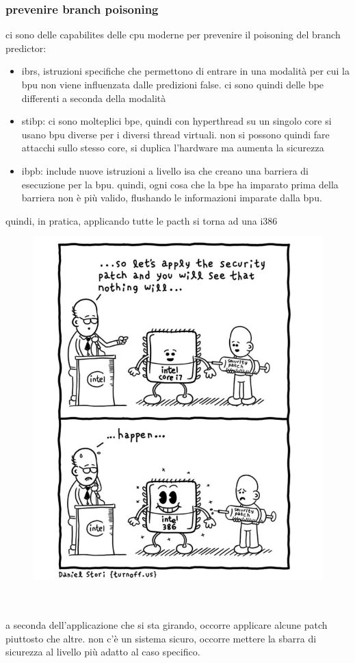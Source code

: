 \documentclass[12pt, oneside]{extbook} %
\begin{document}
\subsubsection{prevenire branch poisoning}
ci sono delle capabilites delle cpu moderne per prevenire il poisoning del branch predictor:
\begin{itemize}
\item ibrs, istruzioni specifiche che permettono di entrare in una modalità per cui la bpu non viene influenzata dalle predizioni false. ci sono quindi delle bpe differenti a seconda della modalità
\item stibp: ci sono molteplici bpe, quindi con hyperthread su un singolo core si usano bpu diverse per i diversi thread virtuali. non si possono quindi fare attacchi sullo stesso core, si duplica l'hardware ma aumenta la sicurezza
\item ibpb: include nuove istruzioni a livello isa che creano una barriera di esecuzione per la bpu. quindi, ogni cosa che la bpe ha imparato prima della barriera non è più valido, flushando le informazioni imparate dalla bpu.
\end{itemize}
quindi, in pratica, applicando tutte le pacth si torna ad una i386\\
\begin{figure}[!h]
	\includegraphics[scale=0.3]{immagini/from_i7_to_i386.png}
\end{figure}
\\\\
a seconda dell'applicazione che si sta girando, occorre applicare alcune patch piuttosto che altre. non c'è un sistema sicuro, occorre mettere la sbarra di sicurezza al livello più adatto al caso specifico.
\end{document}
